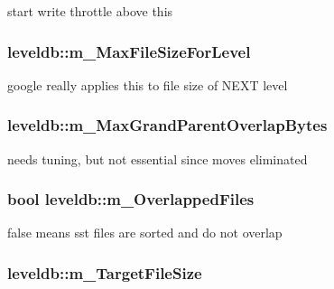 start write throttle above this 

\hypertarget{namespaceleveldb_aecf106e2eaa567faeb35408f7382e1a0}{}
\subsubsection[{m\+\_\+\+Max\+File\+Size\+For\+Level}]{ leveldb\+::m\+\_\+\+Max\+File\+Size\+For\+Level}\label{namespaceleveldb_aecf106e2eaa567faeb35408f7382e1a0}
google really applies this to file size of N\+E\+X\+T level \hypertarget{namespaceleveldb_a15f0b81fa1f74b097cb3a001124d9ca0}{}
\subsubsection[{m\+\_\+\+Max\+Grand\+Parent\+Overlap\+Bytes}]{ leveldb\+::m\+\_\+\+Max\+Grand\+Parent\+Overlap\+Bytes}\label{namespaceleveldb_a15f0b81fa1f74b097cb3a001124d9ca0}
needs tuning, but not essential since moves eliminated \hypertarget{namespaceleveldb_a5e31b908777c34e60340051e3d6b9bda}{}
\subsubsection[{m\+\_\+\+Overlapped\+Files}]{\setlength{\rightskip}{0pt plus 5cm}bool leveldb\+::m\+\_\+\+Overlapped\+Files}\label{namespaceleveldb_a5e31b908777c34e60340051e3d6b9bda}
false means sst files are sorted and do not overlap \hypertarget{namespaceleveldb_a6f54381cb4b8cf99f4deebc5a2f91f75}{}
\subsubsection[{m\+\_\+\+Target\+File\+Size}]{ leveldb\+::m\+\_\+\+Target\+File\+Size}\label{namespaceleveldb_a6f54381cb4b8cf99f4deebc5a2f91f75}


